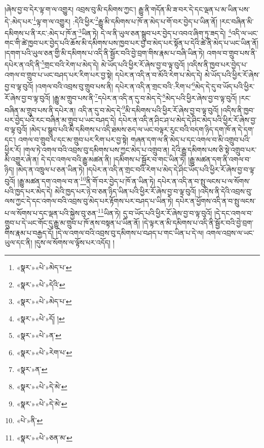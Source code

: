 །ཞེས་བྱ་བ་དེར་ལྟ་ག་ལ་འགྱུར། འབྲས་བུ་མི་དམིགས་ཀྱང་། རྒྱུ་ནི་གདོན་མི་ཟ་བར་དེ་དང་ལྡན་པ་མ་ཡིན་པས་དེ་:མེད་པར་\footnote{«སྣར་»«པེ་»མེད་པ་}ལྟ་ག་ལ་འགྱུར། :དེའི་ཕྱིར་\footnote{«སྣར་»«པེ་»དེའི་}རྒྱུ་མི་དམིགས་པ་ཁོ་ན་མེད་པ་གོ་བར་བྱེད་པ་ཡིན་ནོ། །རང་བཞིན་མི་དམིགས་པ་ནི་རང་:མེད་པ་ཁོ་ན་\footnote{«སྣར་»«པེ་»མེད་པ་}ཡིན་ཏེ། དེ་ལ་ནི་ཡུལ་ཅན་སྒྲུབ་པར་བྱེད་པ་འབའ་ཞིག་ཏུ་ཟད་དེ། \footnote{«སྣར་»«པེ་»དོ། ། }འདི་ལ་ཡང་གང་གི་ཚེ་ཁྱབ་པར་བྱེད་པའི་ཆོས་མི་དམིགས་པས་ཁྱབ་པར་བྱ་བ་མེད་པར་སྟོན་པ་དེའི་ཚེ་ནི་མེད་པ་ཡང་ཡིན་ནོ། །དགག་པའི་ཡུལ་ཅན་གྱི་མི་དམིགས་པ་འདི་ནི་སྦྱོར་བའི་བྱེ་བྲག་གིས་རྣམ་པ་བཞི་ཡིན་ཏེ། འགལ་བ་གྲུབ་པས་ནི་དཔེར་ན་འདི་ནི་\footnote{«སྣར་»«པེ་»ན་}གྲང་བའི་རེག་པ་མེད་དེ། མེ་ཡོད་པའི་ཕྱིར་རོ་ཞེས་བྱ་བ་ལྟ་བུའོ། །འདིས་ནི་ཁྱབ་པར་བྱེད་པ་འགལ་བ་གྲུབ་པ་ཡང་བཤད་པར་རིག་པར་བྱ་སྟེ། དཔེར་ན་འདི་ན་བ་མོའི་རེག་པ་མེད་དེ། མེ་ཡོད་པའི་ཕྱིར་རོ་ཞེས་བྱ་བ་ལྟ་བུའོ། །འགལ་བའི་འབྲས་བུ་གྲུབ་པས་ནི། དཔེར་ན་འདི་ན་གྲང་བའི་:རིག་པ་\footnote{«སྣར་»«པེ་»རེག་པ་}མེད་དེ་དུ་བ་ཡོད་པའི་ཕྱིར་རོ་ཞེས་བྱ་བ་ལྟ་བུའོ། །རྒྱུ་མ་གྲུབ་པས་ནི་\footnote{«སྣར་»ན་}དཔེར་ན་འདི་ན་དུ་བ་མེད་དེ་\footnote{«སྣར་»«པེ་»དེ་མེ་}མེད་པའི་ཕྱིར་ཞེས་བྱ་བ་ལྟ་བུའོ། །རང་བཞིན་མ་གྲུབ་པས་ནི་དཔེར་ན། འདི་ན་དུ་བ་མེད་དེ་\footnote{«སྣར་»«པེ་»དེ་མེ་}མི་དམིགས་པའི་ཕྱིར་རོ་ཞེས་བྱ་བ་ལྟ་བུའོ། །འདིས་ནི་ཁྱབ་པར་བྱེད་པའི་རང་བཞིན་མ་གྲུབ་པ་ཡང་བཤད་དེ། དཔེར་ན་འདི་ན་ཤིང་ཤ་པ་མེད་དེ་ཤིང་མེད་པའི་ཕྱིར་རོ་ཞེས་བྱ་བ་ལྟ་བུའོ། །མེད་པ་སྒྲུབ་པའི་མི་དམིགས་པ་འདི་ཐམས་ཅད་ལ་ཡང་བལྟར་རུང་བའི་བདག་ཉིད་དག་ཁོ་ན་དེ་དག་དང་། འགལ་བ་གྲུབ་པ་དང་མ་གྲུབ་པར་རིག་པར་བྱ་སྟེ། གཞན་དག་ལ་ནི་མེད་པ་དང་འགལ་བ་མི་འགྲུབ་པའི་ཕྱིར་རོ། །གལ་ཏེ་འགལ་བའི་འབྲས་བུ་དམིགས་པས་ཀྱང་མེད་པ་འགྲུབ་ན། དེའི་རྒྱུ་དམིགས་པས་ཅི་སྟེ་འགྲུབ་པར་མི་འགྱུར་ཞེ་ན། དེ་དང་འགལ་བའི་རྒྱུ་མཚན་ནི། །དམིགས་པ་སྦྱོར་བ་གང་ཡིན་ཏེ། །རྒྱུ་མཚན་དག་ནི་འགལ་བ་ཉིད། །མེད་ན་འཁྲུལ་པ་ཅན་ཡིན་ཏེ། །དཔེར་ན་འདི་ན་གྲང་བའི་རེག་པ་མེད་དེ་ཤིང་ཡོད་པའི་ཕྱིར་རོ་ཞེས་བྱ་བ་ལྟ་བུའོ། །རྒྱུ་མཚན་དག་འགལ་བ་ན་\footnote{«པེ་»ནི་}ནི་གོ་བར་བྱེད་པ་ཁོ་ན་ཡིན་ཏེ། དཔེར་ན་འདི་ན་བ་སྤུ་ལངས་པ་ལ་སོགས་པའི་ཁྱད་པར་མེད་དེ། མེའི་ཁྱད་པར་ཉེ་བ་ཅན་ཉིད་ཡིན་པའི་ཕྱིར་རོ་ཞེས་བྱ་བ་ལྟ་བུའོ། །འདིས་ནི་དེའི་འབྲས་བུ་ལས་ཀྱང་དེ་དང་འགལ་བའི་འབྲས་བུ་མེད་པར་རྟོགས་པར་བཤད་པ་ཡིན་ཏེ། དཔེར་ན་ཕྱོགས་འདི་ན་བ་སྤུ་ལངས་པ་ལ་སོགས་པ་དང་ལྡན་པའི་སྐྱེས་བུ་ཅན་\footnote{«སྣར་»«པེ་»ཅན་མ་}ཡིན་ཏེ། དུ་བ་ཡོད་པའི་ཕྱིར་རོ་ཞེས་བྱ་བ་ལྟ་བུའོ། །དེ་དང་འགལ་བ་གྲུབ་པ་དེ་ཡང་གོང་དུ་རྒྱུ་མ་གྲུབ་པ་ཁོ་ནས་བསྟན་པ་ཡིན་ནོ། །དེ་ལྟར་ན་མི་དམིགས་པ་འདི་ནི་སྦྱོར་བའི་བྱེ་བྲག་གིས་རྣམ་པ་བརྒྱད་དོ། །དེ་ལ་འགལ་བའི་འབྲས་བུ་དམིགས་པ་བཤད་པ་གང་ཡིན་པ་དེ་ལ། འགལ་འབྲས་ལ་ཡང་ཡུལ་དང་ནི། །དུས་ལ་སོགས་ལ་ལྟོས་པར་འདོད། །

